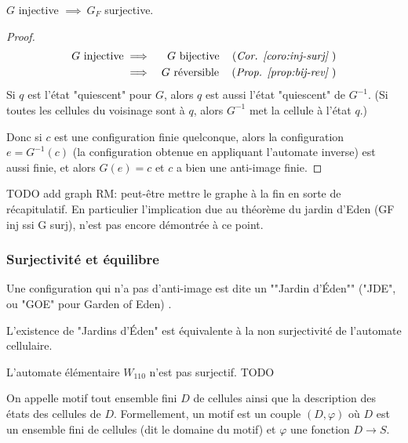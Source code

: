 \begin{coro}
	$G$ injective $\implies \ G_F$ surjective.
\end{coro}


\begin{proof}
	\begin{eqnarray*}
		G \text{ injective} &\implies& G \text{ bijective} \quad\left(\textit{Cor. \ref{coro:inj-surj} }\right)\\
		&\implies& G \text{ réversible} \quad\left(\textit{Prop. \ref{prop:bij-rev} }\right)
	\end{eqnarray*}
	Si $q$ est l'état "quiescent" pour $G$, alors $q$ est aussi l'état "quiescent" de $G^{-1}$.
	(Si toutes les cellules du voisinage sont à $q$, alors $G^{-1}$ met la cellule à l'état $q$.)

	Donc si $c$ est une configuration finie quelconque,  alors la configuration $e = G^{-1}(c)$ (la configuration obtenue en appliquant
	l'automate inverse) est aussi finie, et alors $G(e) = c$ et $c$ a bien une anti-image finie.
\end{proof}

TODO add graph
RM: peut-être mettre le graphe à la fin en sorte de récapitulatif. En particulier l'implication due au  théorème du jardin d'Eden (GF inj ssi  G surj), n'est pas encore démontrée à ce point.


\subsubsection{Surjectivité et équilibre}
\begin{definition}
	Une configuration qui n'a pas d'anti-image est dite un ""Jardin d'Éden"" ("JDE", ou "GOE" pour Garden of Eden) .
\end{definition}

\begin{remarque}
	L'existence de "Jardins d'Éden" est équivalente à la non surjectivité de l'automate cellulaire.
\end{remarque}

\begin{exemple}
	L'automate élémentaire $W_{110}$ n'est pas surjectif. TODO
\end{exemple}


\begin{definition}
On appelle motif tout ensemble fini $D$ de cellules ainsi que la description des états des cellules de $D$. Formellement, un motif est un couple $(D, \varphi)$ où $D$ est un ensemble fini de cellules (dit le domaine du motif) et $\varphi$ une fonction $D \to S$.
\end{definition}


